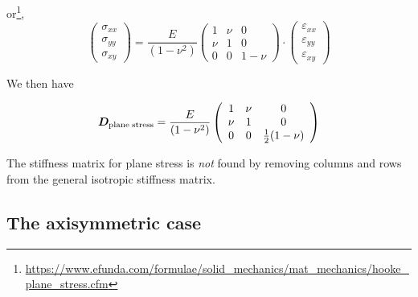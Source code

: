 or\footnote{\url{https://www.efunda.com/formulae/solid_mechanics/mat_mechanics/hooke_plane_stress.cfm}}, 
\begin{equation}
\left(
\begin{array}{c}
\sigma_{xx}\\
\sigma_{yy}\\
\sigma_{xy}
\end{array}
\right)
=\frac{E}{(1-\nu^2)}
\left(
\begin{array}{ccc}
1 & \nu & 0 \\
\nu & 1 & 0 \\
0 &0 &1-\nu
\end{array}
\right)
\cdot
\left(
\begin{array}{c}
\varepsilon_{xx}\\
\varepsilon_{yy}\\
\varepsilon_{xy}
\end{array}
\right)
\end{equation}


We then have
\begin{mdframed}[backgroundcolor=blue!5]
\begin{equation}
{\bm D}_{\rm plane \; stress} = 
\frac{E}{(1-\nu^2)}
\left(
\begin{array}{ccc}
1 & \nu & 0 \\
\nu & 1 & 0 \\
0 &0 &\frac12(1-\nu)
\end{array}
\right)
\end{equation}
\end{mdframed}

\begin{remark}
The stiffness matrix for plane stress is {\it not} found by removing columns 
and rows from the general isotropic stiffness matrix. 
\end{remark}

\subsection{The axisymmetric case} \label{ss:fem_elast_axissymm}

